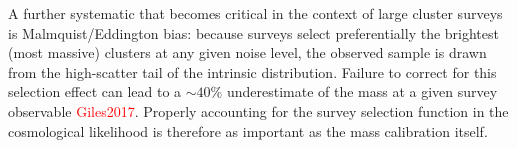 A further systematic that becomes critical in the context of large cluster surveys is Malmquist/Eddington bias: because surveys select preferentially the brightest (most massive) clusters at any given noise level, the observed sample is drawn from the high-scatter tail of the intrinsic distribution. Failure to correct for this selection effect can lead to a $\sim 40\%$ underestimate of the mass at a given survey observable \textcolor{red}{Giles2017}. Properly accounting for the survey selection function in the cosmological likelihood is therefore as important as the mass calibration itself.

